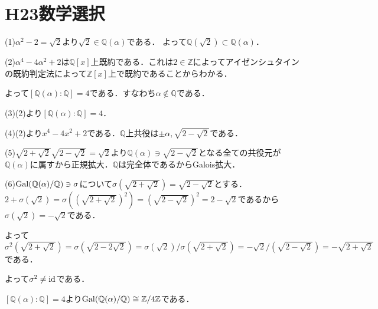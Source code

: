 \documentclass[
		book,
		head_space=20mm,
		foot_space=20mm,
		gutter=10mm,
		line_length=190mm
]{jlreq}
\begin{document}
\section{H23数学選択}
(1)$\alpha^2-2=\sqrt{2}$より$\sqrt{2}\in \mathbb{Q}(\alpha)$である．
よって$\mathbb{Q}(\sqrt{2})\subset \mathbb{Q}(\alpha)$． 

(2)$\alpha^4-4\alpha^2+2$は$\mathbb{Q}[x]$上既約である．これは$2\in \mathbb{Z}$によってアイゼンシュタインの既約判定法によって$\mathbb{Z}[x]$上で既約であることからわかる．

よって$[\mathbb{Q}(\alpha):\mathbb{Q}]=4$である．すなわち$\alpha\notin \mathbb{Q}$である．

(3)(2)より$[\mathbb{Q}(\alpha):\mathbb{Q}]=4$．

(4)(2)より$x^4-4x^2+2$である．$\mathbb{Q}$上共役は$\pm \alpha,\sqrt{2-\sqrt{2}}$である．

(5)$\sqrt{2+\sqrt{2}}\sqrt{2-\sqrt{2}}=\sqrt{2}$より$\mathbb{Q}(\alpha)\ni \sqrt{2-\sqrt{2}}$となる全ての共役元が$\mathbb{Q}(\alpha)$に属すから正規拡大．$\mathbb{Q}$は完全体であるからGalois拡大．

(6)$\mathop{\mathrm{Gal}}(\mathbb{Q}(\alpha)/\mathbb{Q})\ni\sigma$について$\sigma(\sqrt{2+\sqrt{2}})=\sqrt{2-\sqrt{2}}$とする．
$2+\sigma(\sqrt{2})=\sigma((\sqrt{2+\sqrt{2}})^2)=(\sqrt{2-\sqrt{2}})^2=2-\sqrt{2}$であるから$\sigma(\sqrt{2})=-\sqrt{2}$である．

よって$\sigma^2(\sqrt{2+\sqrt{2}})=\sigma(\sqrt{2-2\sqrt{2}})=\sigma(\sqrt{2})/\sigma(\sqrt{2+\sqrt{2}})=-\sqrt{2}/(\sqrt{2-\sqrt{2}})=-\sqrt{2+\sqrt{2}}$である．

よって$\sigma^2\neq \mathop{\mathrm{id}}$である．

$[\mathbb{Q}(\alpha):\mathbb{Q}]=4$より$\mathop{\mathrm{Gal}}(\mathbb{Q}(\alpha)/\mathbb{Q})\cong \mathbb{Z}/4 \mathbb{Z}$である．
\end{document}
